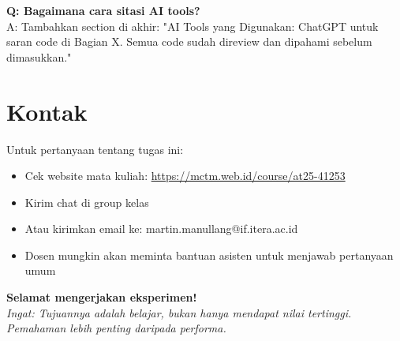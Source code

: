 \documentclass[12pt,a4paper]{article}
\begin{document}
\textbf{Q: Bagaimana cara sitasi AI tools?} \\
A: Tambahkan section di akhir: "AI Tools yang Digunakan: ChatGPT untuk saran code di Bagian X. Semua code sudah direview dan dipahami sebelum dimasukkan."

\section{Kontak}

Untuk pertanyaan tentang tugas ini:
\begin{itemize}
    \item Cek website mata kuliah: \url{https://mctm.web.id/course/at25-41253}
    \item Kirim chat di group kelas
    \item Atau kirimkan email ke: martin.manullang@if.itera.ac.id
    \item Dosen mungkin akan meminta bantuan asisten untuk menjawab pertanyaan umum
\end{itemize}

\vspace{1cm}

\begin{center}
\textbf{Selamat mengerjakan eksperimen!} \\
\textit{Ingat: Tujuannya adalah belajar, bukan hanya mendapat nilai tertinggi.} \\
\textit{Pemahaman lebih penting daripada performa.}
\end{center}
\end{document}
